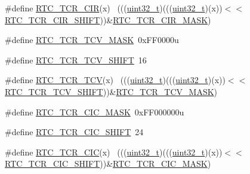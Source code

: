 \begin{DoxyCompactItemize}
\#define \hyperlink{group___r_t_c___register___masks_gaa25059e7519bf8e6316b66836be1cb18}{R\+T\+C\+\_\+\+T\+C\+R\+\_\+\+C\+IR}(x)                                                  ~(((\hyperlink{_p_e___types_8h_a33594304e786b158f3fb30289278f5af}{uint32\+\_\+t})(((\hyperlink{_p_e___types_8h_a33594304e786b158f3fb30289278f5af}{uint32\+\_\+t})(x))$<$$<$\hyperlink{group___r_t_c___register___masks_ga4b8c9ecf8ed798b8c0173ce122874c5e}{R\+T\+C\+\_\+\+T\+C\+R\+\_\+\+C\+I\+R\+\_\+\+S\+H\+I\+FT}))\&\hyperlink{group___r_t_c___register___masks_ga8f198d1dbc7427e1dfabdc4e9f53f8e2}{R\+T\+C\+\_\+\+T\+C\+R\+\_\+\+C\+I\+R\+\_\+\+M\+A\+SK})
\item 
\#define \hyperlink{group___r_t_c___register___masks_ga920f92da02ac0a6ae0931645600e2405}{R\+T\+C\+\_\+\+T\+C\+R\+\_\+\+T\+C\+V\+\_\+\+M\+A\+SK}~0x\+F\+F0000u
\item 
\#define \hyperlink{group___r_t_c___register___masks_ga6bcbafe57cdb430da5ee6902e0bcb224}{R\+T\+C\+\_\+\+T\+C\+R\+\_\+\+T\+C\+V\+\_\+\+S\+H\+I\+FT}~16
\item 
\#define \hyperlink{group___r_t_c___register___masks_ga93b83f72083cd3683e8b75554763bc93}{R\+T\+C\+\_\+\+T\+C\+R\+\_\+\+T\+CV}(x)                                                  ~(((\hyperlink{_p_e___types_8h_a33594304e786b158f3fb30289278f5af}{uint32\+\_\+t})(((\hyperlink{_p_e___types_8h_a33594304e786b158f3fb30289278f5af}{uint32\+\_\+t})(x))$<$$<$\hyperlink{group___r_t_c___register___masks_ga6bcbafe57cdb430da5ee6902e0bcb224}{R\+T\+C\+\_\+\+T\+C\+R\+\_\+\+T\+C\+V\+\_\+\+S\+H\+I\+FT}))\&\hyperlink{group___r_t_c___register___masks_ga920f92da02ac0a6ae0931645600e2405}{R\+T\+C\+\_\+\+T\+C\+R\+\_\+\+T\+C\+V\+\_\+\+M\+A\+SK})
\item 
\#define \hyperlink{group___r_t_c___register___masks_ga788e49f72c48b3c98794b49e27337c64}{R\+T\+C\+\_\+\+T\+C\+R\+\_\+\+C\+I\+C\+\_\+\+M\+A\+SK}~0x\+F\+F000000u
\item 
\#define \hyperlink{group___r_t_c___register___masks_ga84c801695fa1e344e7b2c8e6568cb7c8}{R\+T\+C\+\_\+\+T\+C\+R\+\_\+\+C\+I\+C\+\_\+\+S\+H\+I\+FT}~24
\item 
\#define \hyperlink{group___r_t_c___register___masks_ga18cbc5e75c4ab9ec5664b35a8afc9c4f}{R\+T\+C\+\_\+\+T\+C\+R\+\_\+\+C\+IC}(x)                                                  ~(((\hyperlink{_p_e___types_8h_a33594304e786b158f3fb30289278f5af}{uint32\+\_\+t})(((\hyperlink{_p_e___types_8h_a33594304e786b158f3fb30289278f5af}{uint32\+\_\+t})(x))$<$$<$\hyperlink{group___r_t_c___register___masks_ga84c801695fa1e344e7b2c8e6568cb7c8}{R\+T\+C\+\_\+\+T\+C\+R\+\_\+\+C\+I\+C\+\_\+\+S\+H\+I\+FT}))\&\hyperlink{group___r_t_c___register___masks_ga788e49f72c48b3c98794b49e27337c64}{R\+T\+C\+\_\+\+T\+C\+R\+\_\+\+C\+I\+C\+\_\+\+M\+A\+SK})
$$
\end{DoxyCompactItemize}
